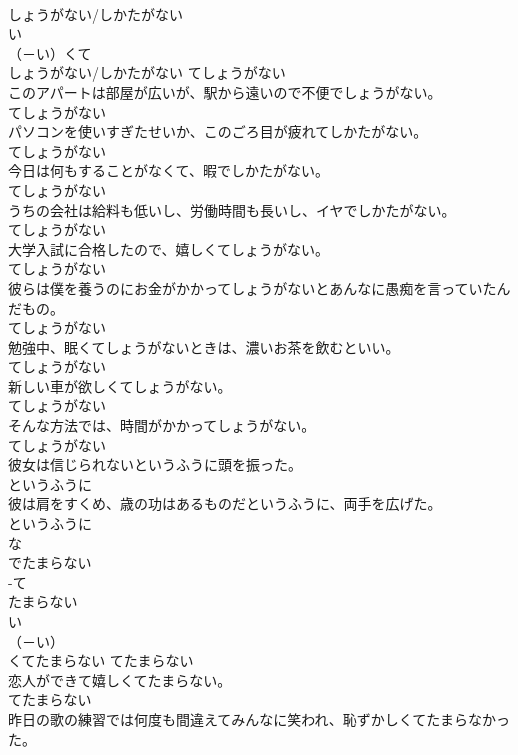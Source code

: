 \documentclass[8pt]{extreport}
\begin{document}
\begin{CJK}{UTF8}{min}
\\	しょうがない/しかたがない	
\\	い
\\	（－い）くて 
\\	しょうがない/しかたがない	てしょうがない
\\	このアパートは部屋が広いが、駅から遠いので不便でしょうがない。	
\\	てしょうがない
\\	パソコンを使いすぎたせいか、このごろ目が疲れてしかたがない。	
\\	てしょうがない
\\	今日は何もすることがなくて、暇でしかたがない。	
\\	てしょうがない
\\	うちの会社は給料も低いし、労働時間も長いし、イヤでしかたがない。	
\\	てしょうがない
\\	大学入試に合格したので、嬉しくてしょうがない。	
\\	てしょうがない
\\	彼らは僕を養うのにお金がかかってしょうがないとあんなに愚痴を言っていたんだもの。	
\\	てしょうがない
\\	勉強中、眠くてしょうがないときは、濃いお茶を飲むといい。	
\\	てしょうがない
\\	新しい車が欲しくてしょうがない。	
\\	てしょうがない
\\	そんな方法では、時間がかかってしょうがない。	
\\	てしょうがない
\\	彼女は信じられないというふうに頭を振った。	
\\	というふうに
\\	彼は肩をすくめ、歳の功はあるものだというふうに、両手を広げた。	
\\	というふうに
\\	な
\\	でたまらない	
\\	-て
\\	たまらない	
\\	い
\\	（－い） 
\\	くてたまらない	てたまらない
\\	恋人ができて嬉しくてたまらない。	
\\	てたまらない
\\	昨日の歌の練習では何度も間違えてみんなに笑われ、恥ずかしくてたまらなかった。	

\end{CJK}
\end{document}
